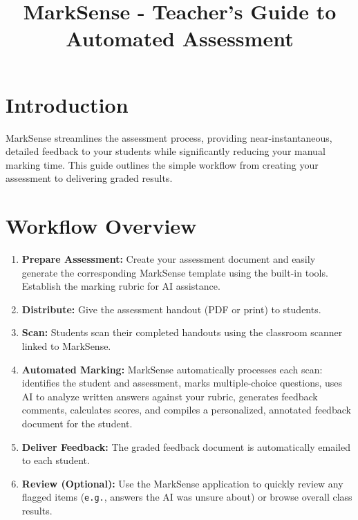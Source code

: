 \documentclass[11pt, a4paper]{article}
\title{MarkSense - Teacher's Guide to Automated Assessment}
\date{} %
\author{} %
\begin{document}
\maketitle
\vspace{-2em} %

\section*{Introduction}

MarkSense streamlines the assessment process, providing near-instantaneous, detailed feedback to your students while significantly reducing your manual marking time. This guide outlines the simple workflow from creating your assessment to delivering graded results.

\section*{Workflow Overview}
\begin{enumerate}
    \item \textbf{Prepare Assessment:} Create your assessment document and easily generate the corresponding MarkSense template using the built-in tools. Establish the marking rubric for AI assistance.
    \item \textbf{Distribute:} Give the assessment handout (PDF or print) to students.
    \item \textbf{Scan:} Students scan their completed handouts using the classroom scanner linked to MarkSense.
    \item \textbf{Automated Marking:} MarkSense automatically processes each scan: identifies the student and assessment, marks multiple-choice questions, uses AI to analyze written answers against your rubric, generates feedback comments, calculates scores, and compiles a personalized, annotated feedback document for the student.
    \item \textbf{Deliver Feedback:} The graded feedback document is automatically emailed to each student.
    \item \textbf{Review (Optional):} Use the MarkSense application to quickly review any flagged items (\texttt{e.g.}, answers the AI was unsure about) or browse overall class results.
\end{enumerate}

\end{document}
